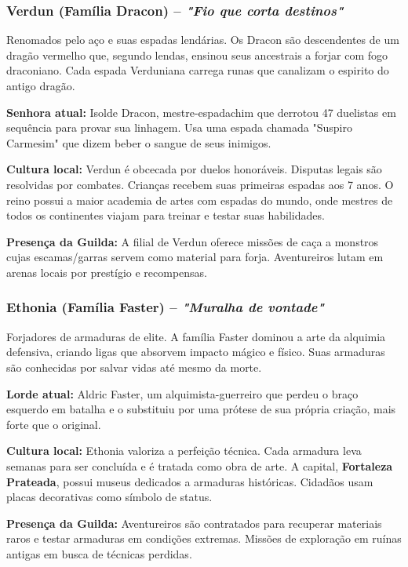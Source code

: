 \subsubsection*{Verdun (Família Dracon) – \textit{"Fio que corta destinos"}}
Renomados pelo aço e suas espadas lendárias. Os Dracon são descendentes de um dragão vermelho que, segundo lendas, ensinou seus ancestrais a forjar com fogo draconiano. Cada espada Verduniana carrega runas que canalizam o espirito do antigo dragão.

\textbf{\ringmfamily Senhora atual:} Isolde Dracon, mestre-espadachim que derrotou 47 duelistas em sequência para provar sua linhagem. Usa uma espada chamada "Suspiro Carmesim" que dizem beber o sangue de seus inimigos.

\textbf{\ringmfamily Cultura local:} Verdun é obcecada por duelos honoráveis. Disputas legais são resolvidas por combates. Crianças recebem suas primeiras espadas aos 7 anos. O reino possui a maior academia de artes com espadas do mundo, onde mestres de todos os continentes viajam para treinar e testar suas habilidades.

\textbf{\ringmfamily Presença da Guilda:} A filial de Verdun oferece missões de caça a monstros cujas escamas/garras servem como material para forja. Aventureiros lutam em arenas locais por prestígio e recompensas.

\subsubsection*{Ethonia (Família Faster) – \textit{"Muralha de vontade"}}
Forjadores de armaduras de elite. A família Faster dominou a arte da alquimia defensiva, criando ligas que absorvem impacto mágico e físico. Suas armaduras são conhecidas por salvar vidas até mesmo da morte.

\textbf{\ringmfamily Lorde atual:} Aldric Faster, um alquimista-guerreiro que perdeu o braço esquerdo em batalha e o substituiu por uma prótese de sua própria criação, mais forte que o original.

\textbf{\ringmfamily Cultura local:} Ethonia valoriza a perfeição técnica. Cada armadura leva semanas para ser concluída e é tratada como obra de arte. A capital, \textbf{Fortaleza Prateada}, possui museus dedicados a armaduras históricas. Cidadãos usam placas decorativas como símbolo de status.

\textbf{\ringmfamily Presença da Guilda:} Aventureiros são contratados para recuperar materiais raros e testar armaduras em condições extremas. Missões de exploração em ruínas antigas em busca de técnicas perdidas.

